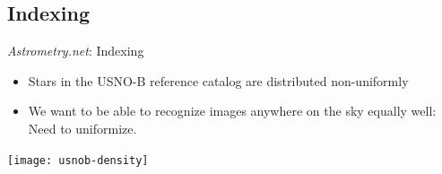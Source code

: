 \documentclass[compress]{beamer}
\newcommand{\an}{\emph{Astrometry.net}\xspace}
\begin{document}
\subsection{Indexing}

\begin{frame}{\an: Indexing}
  \begin{itemize}
  \item Stars in the USNO-B reference catalog are distributed
    \alert{non-uniformly}
  \item We want to be able to recognize images anywhere on the sky equally well:
	Need to \alert{uniformize}.
  \end{itemize}

  \begin{center}
	\texttt{[image: usnob-density]}
  \end{center}
\end{frame}
\end{document}
